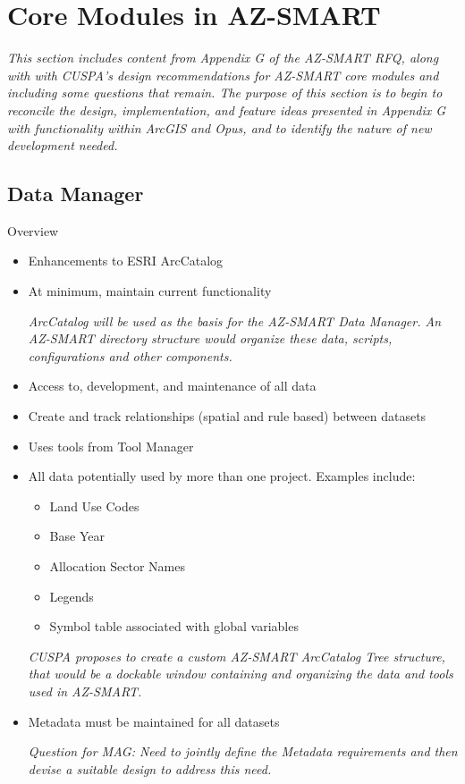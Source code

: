 \documentclass[titlepage]{article}
\begin{document}
\section{Core Modules in AZ-SMART}
\emph{This section includes content from Appendix G of the AZ-SMART RFQ, along with with CUSPA's design recommendations for AZ-SMART core modules and including some questions that remain.  The purpose of this section is to begin to reconcile the design, implementation, and feature ideas presented in Appendix G with functionality within ArcGIS and Opus, and to identify the nature of new development needed.}

\subsection{Data Manager}
Overview
\begin{itemize}
\item Enhancements to ESRI ArcCatalog
\item At minimum, maintain current functionality

\emph{ArcCatalog will be used as the basis for the AZ-SMART Data Manager.  An AZ-SMART directory structure would organize these data, scripts, configurations and other components.}

\item Access to, development, and maintenance of all data
\item Create and track relationships (spatial and rule based) between datasets
\item Uses tools from Tool Manager
\item All data potentially used by more than one project. Examples include:
\begin{itemize}
\item Land Use Codes
\item Base Year
\item Allocation Sector Names
\item Legends
\item Symbol table associated with global variables
\end{itemize}

\emph{CUSPA proposes to create a custom AZ-SMART ArcCatalog Tree structure, that would be a dockable window containing and organizing the data and tools used in AZ-SMART.}


\item Metadata must be maintained for all datasets

\emph{Question for MAG: Need to jointly define the Metadata requirements and then devise a suitable design to address this need.}


\end{itemize}
\end{document}
